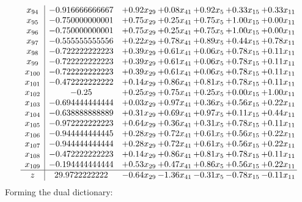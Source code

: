 \documentclass[8pt]{article}
\begin{document}
\[\begin{array}{c| c c@{\hskip 2pt} c@{\hskip 2pt} c@{\hskip 2pt} c@{\hskip 2pt} c@{\hskip 2pt} }
 x_{94}   &  -0.916666666667 & +  0.92 x_{29} & +  0.08 x_{41} & +  0.92 x_{5} & +  0.33 x_{15} & +  0.33 x_{11}\\
 x_{95}   &  -0.750000000001 & +  0.75 x_{29} & +  0.25 x_{41} & +  0.75 x_{5} & +  1.00 x_{15} & +  0.00 x_{11}\\
 x_{96}   &  -0.750000000001 & +  0.75 x_{29} & +  0.25 x_{41} & +  0.75 x_{5} & +  1.00 x_{15} & +  0.00 x_{11}\\
 x_{97}   &  -0.555555555556 & +  0.22 x_{29} & +  0.78 x_{41} & +  0.89 x_{5} & +  0.44 x_{15} & +  0.78 x_{11}\\
 x_{98}   &  -0.722222222223 & +  0.39 x_{29} & +  0.61 x_{41} & +  0.06 x_{5} & +  0.78 x_{15} & +  0.11 x_{11}\\
 x_{99}   &  -0.722222222223 & +  0.39 x_{29} & +  0.61 x_{41} & +  0.06 x_{5} & +  0.78 x_{15} & +  0.11 x_{11}\\
 x_{100}   &  -0.722222222223 & +  0.39 x_{29} & +  0.61 x_{41} & +  0.06 x_{5} & +  0.78 x_{15} & +  0.11 x_{11}\\
 x_{101}   &  -0.472222222222 & +  0.14 x_{29} & +  0.86 x_{41} & +  0.81 x_{5} & +  0.78 x_{15} & +  0.11 x_{11}\\
 x_{102}   &  -0.25 & +  0.25 x_{29} & +  0.75 x_{41} & +  0.25 x_{5} & +  0.00 x_{15} & +  1.00 x_{11}\\
 x_{103}   &  -0.694444444444 & +  0.03 x_{29} & +  0.97 x_{41} & +  0.36 x_{5} & +  0.56 x_{15} & +  0.22 x_{11}\\
 x_{104}   &  -0.638888888889 & +  0.31 x_{29} & +  0.69 x_{41} & +  0.97 x_{5} & +  0.11 x_{15} & +  0.44 x_{11}\\
 x_{105}   &  -0.972222222223 & +  0.64 x_{29} & +  0.36 x_{41} & +  0.31 x_{5} & +  0.78 x_{15} & +  0.11 x_{11}\\
 x_{106}   &  -0.944444444445 & +  0.28 x_{29} & +  0.72 x_{41} & +  0.61 x_{5} & +  0.56 x_{15} & +  0.22 x_{11}\\
 x_{107}   &  -0.944444444444 & +  0.28 x_{29} & +  0.72 x_{41} & +  0.61 x_{5} & +  0.56 x_{15} & +  0.22 x_{11}\\
 x_{108}   &  -0.472222222223 & +  0.14 x_{29} & +  0.86 x_{41} & +  0.81 x_{5} & +  0.78 x_{15} & +  0.11 x_{11}\\
 x_{109}   &  -0.194444444444 & +  0.53 x_{29} & +  0.47 x_{41} & +  0.86 x_{5} & +  0.56 x_{15} & +  0.22 x_{11}\\
\hline
z    &  29.9722222222 & -0.64 x_{29} & -1.36 x_{41} & -0.31 x_{5} & -0.78 x_{15} & -0.11 x_{11}\\
\end{array}\]
Forming the dual dictionary:
\end{document}
